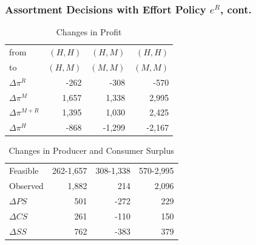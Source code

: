\begin{frame}
\frametitle{Assortment Decisions with Effort Policy $e^R$, cont.}
\vspace{-0.4in}
\begin{table}[htp]
\caption{Changes in Profit}
\begin{center}
\begin{tabular}{|l| rrr|}
\hline
from &\hspace{0.15in} $(H,H)$ &\hspace{0.15in} $(H,M)$ & \hspace{0.15in}$(H,H)$ \\
to &\hspace{0.15in} $(H,M)$ & \hspace{0.15in}$(M,M)$ & \hspace{0.15in}$(M,M)$\\
 \hline
$\Delta \pi^R$&   -262 & -308& -570 \\
$\Delta \pi^M$ &  1,657 & 1,338 & 2,995 \\
$\Delta \pi^{M+R}$&   1,395 & 1,030& 2,425 \\
$\Delta \pi^H$  &-868 & -1,299 & -2,167 \\
 \hline
 \end{tabular}
\end{center}
\label{tab:assortmentonly2}
\end{table}
\vspace{-0.3in}
\begin{table}[htp]
\begin{center}
\caption{Changes in Producer and Consumer Surplus}
\begin{tabular}{|l| rrr|}
\hline
Feasible & 262-1,657 & 308-1,338&570-2,995 \\
Observed & 1,882 & 214& 2,096 \\
\hline
$\Delta PS$ & 501 & -272 & 229 \\
$\Delta CS$ &261 & -110 & 150 \\
$\Delta SS$ &762 & -383 & 379 \\ \hline
\end{tabular}
\end{center}
\label{tab:assortmentonly3}
\end{table}

\end{frame}

